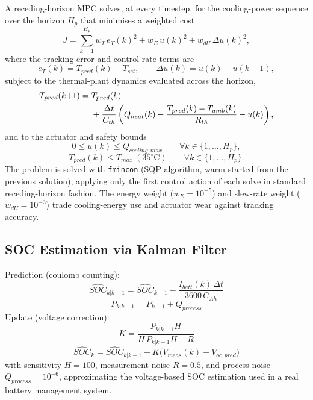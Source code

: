 \documentclass[10pt,conference]{IEEEtran}
\begin{document}
A receding-horizon MPC solves, at every timestep, for the cooling-power sequence over the horizon $H_p$ that minimises a weighted cost
\begin{equation}
J = \sum_{k=1}^{H_p} w_T\,e_T(k)^2 + w_E\,u(k)^2 + w_{dU}\,\Delta u(k)^2,
\end{equation}
where the tracking error and control-rate terms are
\begin{equation}
e_T(k) = T_{pred}(k)-T_{set}, \qquad \Delta u(k) = u(k)-u(k-1),
\end{equation}
subject to the thermal-plant dynamics evaluated across the horizon,
\begin{align}
T_{pred}(k{+}1) = {}& T_{pred}(k) \notag \\
& + \frac{\Delta t}{C_{th}}\left(Q_{heat}(k)-\frac{T_{pred}(k)-T_{amb}(k)}{R_{th}}-u(k)\right),
\end{align}
and to the actuator and safety bounds
\begin{equation}
0\le u(k)\le Q_{cooling,max} \qquad \forall k\in\{1,\dots,H_p\},
\end{equation}
\begin{equation}
T_{pred}(k)\le T_{max}\ (35^{\circ}\text{C}) \qquad \forall k\in\{1,\dots,H_p\}.
\end{equation}
The problem is solved with \texttt{fmincon} (SQP algorithm, warm-started from the previous solution), applying only the first control action of each solve in standard receding-horizon fashion. The energy weight ($w_E=10^{-5}$) and slew-rate weight ($w_{dU}=10^{-3}$) trade cooling-energy use and actuator wear against tracking accuracy.

\subsection{SOC Estimation via Kalman Filter}

Prediction (coulomb counting):
\begin{equation}
\widehat{SOC}_{k|k-1} = \widehat{SOC}_{k-1} - \frac{I_{batt}(k)\,\Delta t}{3600\,C_{Ah}}
\end{equation}
\begin{equation}
P_{k|k-1} = P_{k-1} + Q_{process}
\end{equation}
Update (voltage correction):
\begin{equation}
K = \frac{P_{k|k-1}H}{H\,P_{k|k-1}H + R}
\end{equation}
\begin{equation}
\widehat{SOC}_k = \widehat{SOC}_{k|k-1} + K\big(V_{meas}(k)-V_{oc,pred}\big)
\end{equation}
with sensitivity $H=100$, measurement noise $R=0.5$, and process noise $Q_{process}=10^{-6}$, approximating the voltage-based SOC estimation used in a real battery management system.
\end{document}
